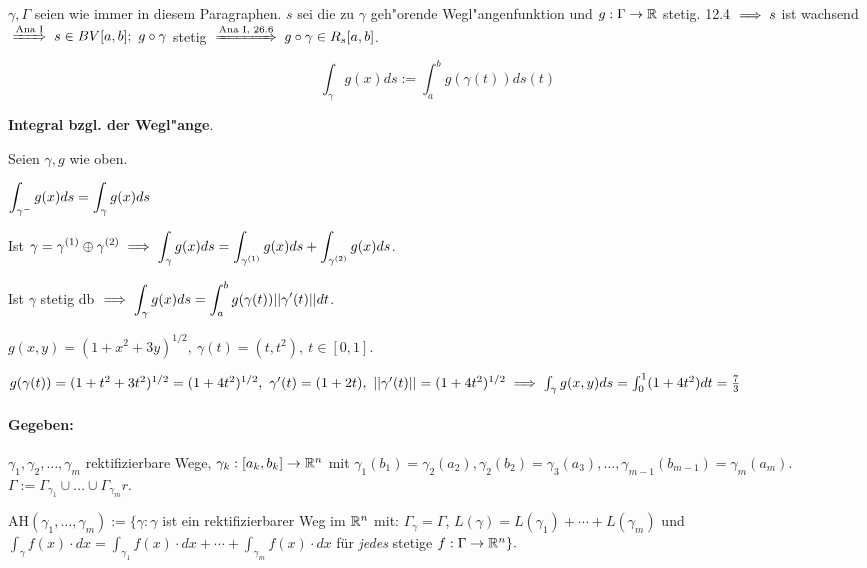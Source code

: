 \documentclass[a4paper,twoside,DIV15,BCOR12mm]{scrbook}
\begin{document}
\begin{definition}
$\gamma,\Gamma$ seien wie immer in diesem Paragraphen. $s$ sei die zu $\gamma$ geh"orende Wegl"angenfunktion und $g:\Gamma \to \mathbb{R}$ stetig. 12.4 $\implies s$ ist wachsend $\folgtnach{Ana I} s \in BV[a,b];\ g\circ\gamma$ stetig $\folgtnach{Ana I, 26.6} g\circ\gamma \in R_s[a,b]$.

$$\int_\gamma g(x) ds := \int_a^b g(\gamma(t))ds(t)$$

\textbf{Integral bzgl. der Wegl"ange}.
\end{definition}

\begin{satz}
Seien $\gamma,g$ wie oben.
\begin{liste}
\item $\displaystyle{\int_{\gamma^-} g(x) ds = \int_\gamma g(x) ds}$
\item Ist $\displaystyle{\gamma = \gamma^{(1)} \oplus \gamma^{(2)} \ensuremath{\implies}\int_\gamma g(x)ds = \int_{\gamma^{(1)}} g(x)ds + \int_{\gamma^{(2)}} g(x)ds}$.
\item Ist $\gamma$ stetig db $\implies \displaystyle{\int_\gamma g(x)ds = \int_a^b g(\gamma(t))||\gamma'(t)||dt}$.
\end{liste}
\end{satz}

\begin{beispiel}
$g(x,y) = (1+x^2+3y)^{1/2},\ \gamma(t) = (t,t^2),\ t\in[0,1].$

$g(\gamma(t)) = (1+t^2+3t^2)^{1/2} = (1+4t^2)^{1/2},\ \gamma'(t) = (1+2t),\ ||\gamma'(t)|| = (1+4t^2)^{1/2} \implies \int_\gamma g(x,y)ds = \int_0^1 (1+4t^2) dt = \frac{7}{3}$
\end{beispiel}

\paragraph{Gegeben:} $\gamma_1,\gamma_2,\ldots,\gamma_m$ rektifizierbare Wege, $\gamma_k:[a_k,b_k]\to\mathbb{R}^n$ mit $\gamma_1(b_1) = \gamma_2(a_2), \gamma_2(b_2) = \gamma_3(a_3),\ldots , \gamma_{m-1}(b_{m-1}) = \gamma_m(a_m)$. $\Gamma := \Gamma_{\gamma_1} \cup \ldots \cup \Gamma_{\gamma_m}r$.

$\text{AH}(\gamma_1,\ldots,\gamma_m) := \{\gamma:\gamma$ ist ein rektifizierbarer Weg im $\mathbb{R}^n$ mit: $\Gamma_\gamma=\Gamma$, $L(\gamma)=L(\gamma_1)+\cdots+L(\gamma_m)$ und $\int_\gamma f(x)\cdot dx = \int_{\gamma_1}f(x)\cdot dx+ \cdots + \int_{\gamma_m}f(x)\cdot dx$ für \emph{jedes} stetige $f:\Gamma\to\mathbb{R}^n\}.$
\end{document}
